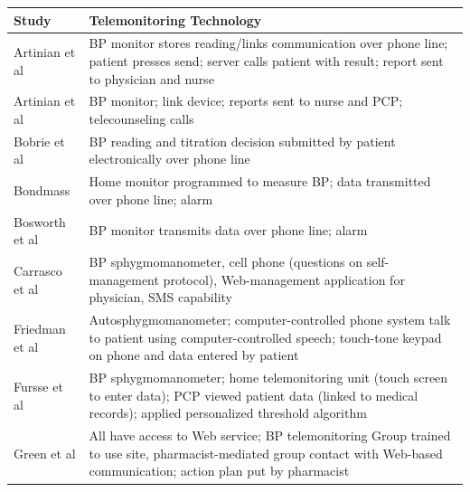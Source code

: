 \documentclass[11pt]{article}
\begin{document}
\begin{center}
\begin{tabular}{|p{3cm}|p{15cm}|}
\hline
\textbf{Study} & \textbf{Telemonitoring Technology}                                                                                                                                         \\ \hline
Artinian et al\cite{Im1} & BP monitor stores reading/links communication over phone line; patient presses send; server calls patient with result; report sent to physician and nurse                \\ \hline
Artinian et al\cite{Im2} & BP monitor; link device; reports sent to nurse and PCP; telecounseling calls                                                                                               \\ \hline
Bobrie et al\cite{Im3}   & BP reading and titration decision submitted by patient electronically over phone line                                                                                      \\ \hline
Bondmass\cite{Im4}       & Home monitor programmed to measure BP; data transmitted over phone line; alarm                                                                                             \\ \hline
Bosworth et al\cite{Im5} & BP monitor transmits data over phone line; alarm                                                                                                                           \\ \hline
Carrasco et al\cite{Im6} & BP sphygmomanometer, cell phone (questions on self-management protocol), Web-management application for physician, SMS capability                                          \\ \hline
Friedman et al\cite{Im7} & Autosphygmomanometer; computer-controlled phone system talk to patient using computer-controlled speech; touch-tone keypad on phone and data entered by patient            \\ \hline
Fursse et al\cite{Im8}   & BP sphygmomanometer; home telemonitoring unit (touch screen to enter data); PCP viewed patient data (linked to medical records); applied personalized threshold algorithm  \\ \hline
Green et al\cite{Im9}    & All have access to Web service; BP telemonitoring Group trained to use site, pharmacist-mediated group contact with Web-based communication; action plan put by pharmacist \\ \hline

\end{tabular}
\end{center}
\end{document}
